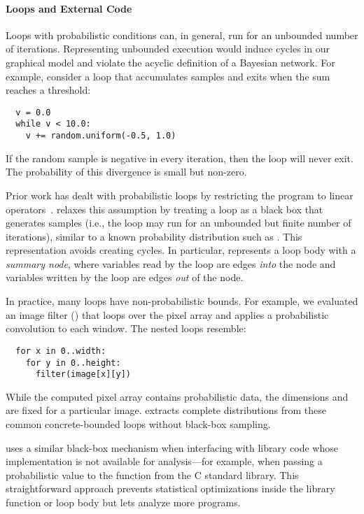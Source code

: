 \label{passert:sec:loops}


\paragraph{Loops and External Code}
Loops with probabilistic conditions can, in general, run for an
unbounded number of iterations. Representing unbounded execution would
induce cycles in our graphical
model and violate the acyclic definition of a Bayesian network. For
example, consider a loop that accumulates samples and exits when the
sum reaches a threshold:
%
\begin{lstlisting}
  v = 0.0
  while v < 10.0:
    v += random.uniform(-0.5, 1.0)
\end{lstlisting}
%
If the random sample is negative in every iteration, then the
loop will never exit. The probability of this divergence is small but non-zero.

Prior work has dealt with probabilistic loops by restricting the program
to linear operators~\cite{sriram-pldi}. \tool relaxes this
assumption by treating a loop as a
black box that generates samples (i.e., the loop may run for an
unbounded but finite number of iterations), similar to a known
probability distribution such as .
This representation avoids creating cycles.
In particular, \tool represents a loop body with a
\emph{summary node}, where variables read by the loop are
edges \emph{into} the node and variables written by the loop are edges \emph{out} of the node.

In practice, many loops have
non-probabilistic bounds. For example, we evaluated an image filter
() that loops over the pixel array and applies a probabilistic
convolution to each window. The nested loops resemble:
%
\begin{lstlisting}
  for x in 0..width:
    for y in 0..height:
      filter(image[x][y])
\end{lstlisting}
%
While the computed pixel array contains probabilistic data, the dimensions
 and  are fixed
for a particular image. \tool extracts complete distributions from these common
concrete-bounded loops without black-box sampling.

\tool uses a similar black-box mechanism when interfacing with library code whose
implementation is not available for analysis---for example, when passing a
probabilistic value to the  function from the C standard library.
This straightforward approach prevents statistical optimizations inside the
library function or loop body but lets \tool analyze more programs.

